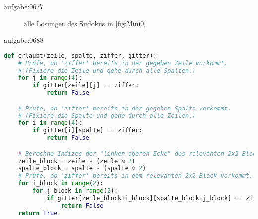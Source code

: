 \begin{antwort}{aufgabe:0677}
\begin{figure}[H]
\centering
{}
\caption{alle Lösungen des Sudokus in \cref{fig:Mini0}}
\label{fig:aufgabe0677}
\end{figure}
\end{antwort}

\begin{antwort}{aufgabe:0688}
\lstset{basicstyle=\ttfamily\footnotesize}
\begin{lstlisting}[language=Python,caption=Implementation der Funktion \pythoninline{erlaubt}]
def erlaubt(zeile, spalte, ziffer, gitter):
	# Prüfe, ob 'ziffer' bereits in der gegeben Zeile vorkommt.
	# (Fixiere die Zeile und gehe durch alle Spalten.)
	for j in range(4):
		if gitter[zeile][j] == ziffer:
			return False

	# Prüfe, ob 'ziffer' bereits in der gegeben Spalte vorkommt.
	# (Fixiere die Spalte und gehe durch alle Zeilen.)
	for i in range(4):
		if gitter[i][spalte] == ziffer:
			return False

	# Berechne Indizes der "linken oberen Ecke" des relevanten 2x2-Blocks.
	zeile_block = zeile - (zeile % 2)
	spalte_block = spalte - (spalte % 2)
	# Prüfe, ob 'ziffer' bereits in dem relevanten 2x2-Block vorkommt.
	for i_block in range(2):
		for j_block in range(2):
			if gitter[zeile_block+i_block][spalte_block+j_block] == ziffer:
				return False
	return True
\end{lstlisting}
\lstset{style=mystyle}
\end{antwort}


